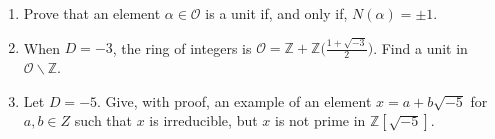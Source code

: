 \documentclass{report}
\newcommand\Z{{\mathbb Z}}
\newcommand\dsp{\displaystyle}
\begin{document}
\begin{enumerate}
\begin{enumerate}

\item Prove that an element $\alpha \in \mathcal O$ is a unit if, and only if, $N(\alpha) = \pm1$.

\item  When $D = -3$, the ring of integers is $\dsp \mathcal O = \Z + \Z \bigg(\frac{1 + \sqrt{-3}}{2}\bigg)$.
Find a unit in $\mathcal O \smallsetminus \Z$.  

\item  Let $D=-5$.  Give, with proof, an example of an element $x = a + b \sqrt{-5}$ for $a, b \in Z$
such that $x$ is irreducible, but $x$ is not prime in $\Z [ \sqrt{-5}]$.  
\end{enumerate}

\end{enumerate}
\end{document}
